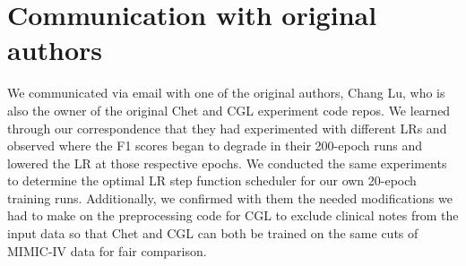 \documentclass[11pt,a4paper,fleqn]{article}
\begin{document}

\section{Communication with original authors}
We communicated via email with one of the original authors, Chang Lu, who is
also the owner of the original Chet and CGL experiment code repos. We learned
through our correspondence that they had experimented with different LRs and
observed where the F1 scores began to degrade in their 200-epoch runs and
lowered the LR at those respective epochs. We conducted the same experiments to
determine the optimal LR step function scheduler for our own 20-epoch training
runs. Additionally, we confirmed with them the needed modifications we had to
make on the preprocessing code for CGL to exclude clinical notes from the input
data so that Chet and CGL can both be trained on the same cuts of MIMIC-IV data
for fair comparison.





\end{document}

